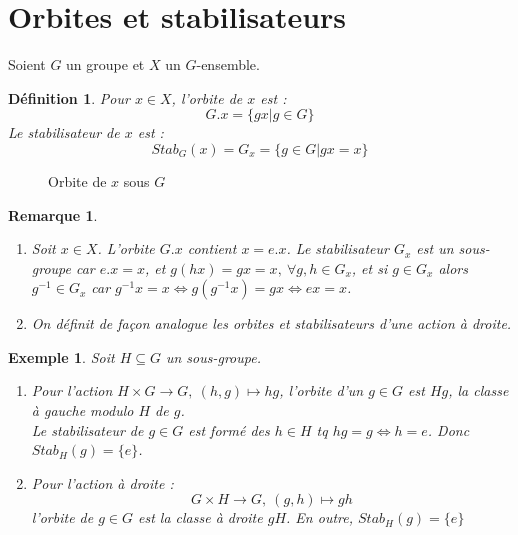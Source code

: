 \documentclass[a4paper, oneside]{report}
\theoremstyle{break}
\newtheorem{defi}[thm]{Définition}
\newtheorem{exem}[thm]{Exemple}
\newtheorem{remar}[thm]{Remarque}
\newcommand{\x}{\times}
\begin{document}
\section{Orbites et stabilisateurs}
Soient $G$ un groupe et $X$ un $G$-ensemble.

\begin{defi}
	Pour $x\in X$, l'orbite de $x$ est :
	$$G.x=\{gx | g\in G \}$$
	Le stabilisateur de $x$ est :
	$$Stab_G(x)=G_x=\{g\in G | gx=x \}$$
\end{defi}

\begin{figure} [h]
	\begin{center}
		\caption{Orbite de $x$ sous $G$}
	\end{center}	
\end{figure}

\begin{remar}
	\begin{enumerate}
		\item Soit $x\in X$. L'orbite $G.x$ contient $x=e.x$. Le stabilisateur $G_x$ est un sous-groupe car $e.x=x$, et $g(hx)=gx=x,~\forall g,h\in G_x$, et si $g\in G_x$ alors $g^{-1}\in G_x$ car $g^{-1}x = x \Leftrightarrow g(g^{-1}x)=gx \Leftrightarrow ex = x$.
		\item On définit de façon analogue les orbites et stabilisateurs d'une action à droite.
	\end{enumerate}
\end{remar}

\begin{exem}
	Soit $H\subseteq G$ un sous-groupe.
	\begin{enumerate}
		\item Pour l'action $H\x G \rightarrow G,~(h,g)\mapsto hg$, l'orbite d'un $g\in G$ est $Hg$, la classe à gauche modulo $H$ de $g$.\\
		Le stabilisateur de $g\in G$ est formé des $h\in H$ tq $hg=g \Leftrightarrow h=e$. Donc $Stab_H(g)=\{e\}$.\\
		\item Pour l'action à droite :
		$$G\x H \rightarrow G,~(g,h)\mapsto gh$$
		l'orbite de $g\in G$ est la classe à droite $gH$. En outre, $Stab_H(g)=\{e\}$
	\end{enumerate}
\end{exem}
\end{document}
